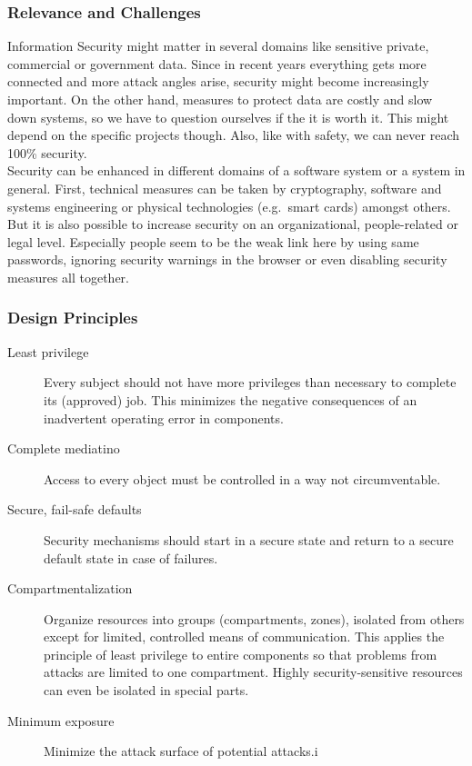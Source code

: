 \subsubsection{Relevance and Challenges}
Information Security might matter in several domains like sensitive private, commercial or government data.
Since in recent years everything gets more connected and more attack angles arise, security might become increasingly important.
On the other hand, measures to protect data are costly and slow down systems, so we have to question ourselves if the it is worth it.
This might depend on the specific projects though.
Also, like with safety, we can never reach 100\% security.\\
Security can be enhanced in different domains of a software system or a system in general.
First, technical measures can be taken by cryptography, software and systems engineering or physical technologies (e.g.\ smart cards) amongst others.
But it is also possible to increase security on an organizational, people-related or legal level.
Especially people seem to be the weak link here by using same passwords, ignoring security warnings in the browser or even disabling security measures all together.

\subsubsection{Design Principles}
\begin{description}
  \item[Least privilege] Every subject should not have more privileges than necessary to complete its (approved) job.
    This minimizes the negative consequences of an inadvertent operating error in components.
  \item[Complete mediatino] Access to every object must be controlled in a way not circumventable.
  \item[Secure, fail-safe defaults] Security mechanisms should start in a secure state and return to a secure default state in case of failures.
  \item[Compartmentalization] Organize resources into groups (compartments, zones), isolated from others except for limited, controlled means of communication.
    This applies the principle of least privilege to entire components so that problems from attacks are limited to one compartment. Highly security-sensitive resources can even be isolated in special parts.
  \item[Minimum exposure] Minimize the attack surface of potential attacks.i
\end{description}

